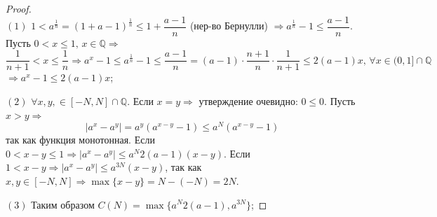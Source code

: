 \documentclass[12pt]{article}
\newcommand{\MQ}{\mathbb{Q}}
\theoremstyle{definition}
\begin{document}
\begin{proof}\hfill\\
	$(1)$ $1 < a^\frac{1}{n} =(1 + a - 1)^\frac{1}{n} \leq 1 + \dfrac{a - 1}{n}$ (нер-во Бернулли) $\Rightarrow a^\frac{1}{n} - 1 \leq \dfrac{a - 1}{n}$. Пусть $0 < x \leq 1, \, x \in \MQ \Rightarrow$ \\
	$$\dfrac{1}{n+1} < x \leq \dfrac{1}{n} \Rightarrow a^x - 1 \leq a^\frac{1}{n} -1 \leq \dfrac{a-1}{n} = (a-1){\cdot}\dfrac{n+1}{n}{\cdot}\dfrac{1}{n+1} \leq 2 (a-1) x, \, \forall x \in (0,1] \cap \MQ$$ 
	$\Rightarrow a^x - 1 \leq 2(a-1)x$;
	
	$(2)$ $\forall x,y, \in [-N, N] \cap \MQ$. Если $x = y \Rightarrow$ утверждение очевидно: $0 \leq 0$. Пусть $x > y \Rightarrow$ 
	$$|a^x - a^y| = a^y(a^{x-y} - 1) \leq a^N(a^{x-y} -1)$$ 
	так как функция монотонная. Если $0 < x - y \leq 1 \Rightarrow |a^x - a^y| \leq a^N 2(a-1)(x-y)$. Если $1 < x-y \Rightarrow |a^x - a^y| \leq a^{3N}(x-y)$, так как $x,y \in [-N,N] \Rightarrow \max\{x-y\} = N - (-N) = 2N$. 
	
	$(3)$ Таким образом $C(N) = \max\{a^N2(a-1), a^{3N}\}$;

\end{proof}
\end{document}

